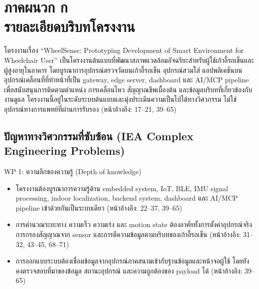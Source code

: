 \chapter[รายละเอียดบริบทโครงงาน]{\texorpdfstring{ภาคผนวก ก\\รายละเอียดบริบทโครงงาน}{Appendix A: Project Context}}
\label{app:project_context}

\newcommand{\wschecked}{%
    \makebox[1.4em][l]{%
        \begingroup
        \setlength{\fboxsep}{1pt}%
        \raisebox{0.1ex}{\fbox{\scriptsize\ensuremath{\checkmark}}}%
        \endgroup
    }%
}
\newcommand{\wspageref}[1]{(หน้าอ้างอิง: #1)}

โครงงานเรื่อง ``WheelSense: Prototyping Development of Smart Environment for Wheelchair User'' เป็นโครงงานต้นแบบที่พัฒนาสภาพแวดล้อมอัจฉริยะสำหรับผู้ใช้เก้าอี้รถเข็นและผู้สูงอายุในอาคาร โดยบูรณาการอุปกรณ์ตรวจวัดบนเก้าอี้รถเข็น อุปกรณ์สวมใส่ แอปพลิเคชันบนอุปกรณ์เคลื่อนที่ที่ทำหน้าที่เป็น gateway, edge server, dashboard และ AI/MCP pipeline เพื่อสนับสนุนการติดตามตำแหน่ง การเคลื่อนไหว สัญญาณชีพเบื้องต้น และข้อมูลบริบทที่เกี่ยวข้องกับงานดูแล โครงงานนี้อยู่ในระดับระบบต้นแบบและมุ่งประเมินความเป็นไปได้ทางวิศวกรรม ไม่ใช่อุปกรณ์ทางการแพทย์ที่ผ่านการรับรอง \wspageref{17--21, 39--65}

\section{ปัญหาทางวิศวกรรมที่ซับซ้อน (IEA Complex Engineering Problems)}

\noindent\wschecked WP 1: ความลึกของความรู้ (Depth of knowledge)
\begin{itemize}
    \item โครงงานต้องบูรณาการความรู้ด้าน embedded system, IoT, BLE, IMU signal processing, indoor localization, backend system, dashboard และ AI/MCP pipeline เข้าด้วยกันเป็นระบบเดียว \wspageref{22--37, 39--65}
    \item การคำนวณระยะทาง ความเร็ว ความเร่ง และ motion state ต้องอาศัยทั้งการตั้งค่าอุปกรณ์จริง การกรองสัญญาณจาก sensor และการตีความข้อมูลตามบริบทของเก้าอี้รถเข็น \wspageref{31--32, 43--45, 68--71}
    \item การออกแบบระบบต้องเชื่อมข้อมูลจากอุปกรณ์ภาคสนามเข้ากับฐานข้อมูลและหน้าจอผู้ใช้ โดยยังคงตรวจสอบที่มาของข้อมูล สถานะอุปกรณ์ และความถูกต้องของ payload ได้ \wspageref{39--65}
\end{itemize}

